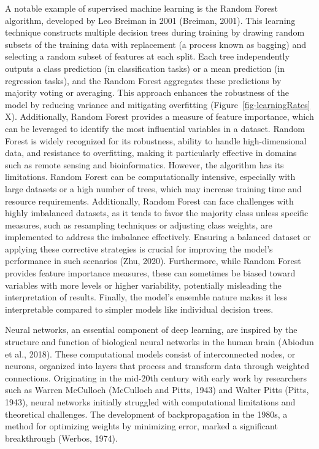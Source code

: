 \documentclass[
  letterpaper,
  11pt,
  english,
  singlespacing,
  headsepline]{MastersDoctoralThesis}
\begin{document}
\begin{spacing}{1.5}
A notable example of supervised machine learning is the Random Forest
algorithm, developed by Leo Breiman in 2001 (Breiman, 2001). This
learning technique constructs multiple decision trees during training by
drawing random subsets of the training data with replacement (a process
known as bagging) and selecting a random subset of features at each
split. Each tree independently outputs a class prediction (in
classification tasks) or a mean prediction (in regression tasks), and
the Random Forest aggregates these predictions by majority voting or
averaging. This approach enhances the robustness of the model by
reducing variance and mitigating overfitting
(Figure~\ref{fig-learningRates} X). Additionally, Random Forest provides
a measure of feature importance, which can be leveraged to identify the
most influential variables in a dataset. Random Forest is widely
recognized for its robustness, ability to handle high-dimensional data,
and resistance to overfitting, making it particularly effective in
domains such as remote sensing and bioinformatics. However, the
algorithm has its limitations. Random Forest can be computationally
intensive, especially with large datasets or a high number of trees,
which may increase training time and resource requirements.
Additionally, Random Forest can face challenges with highly imbalanced
datasets, as it tends to favor the majority class unless specific
measures, such as resampling techniques or adjusting class weights, are
implemented to address the imbalance effectively. Ensuring a balanced
dataset or applying these corrective strategies is crucial for improving
the model's performance in such scenarios (Zhu, 2020). Furthermore,
while Random Forest provides feature importance measures, these can
sometimes be biased toward variables with more levels or higher
variability, potentially misleading the interpretation of results.
Finally, the model's ensemble nature makes it less interpretable
compared to simpler models like individual decision trees.

Neural networks, an essential component of deep learning, are inspired
by the structure and function of biological neural networks in the human
brain (Abiodun et al., 2018). These computational models consist of
interconnected nodes, or neurons, organized into layers that process and
transform data through weighted connections. Originating in the mid-20th
century with early work by researchers such as Warren McCulloch
(McCulloch and Pitts, 1943) and Walter Pitts (Pitts, 1943), neural
networks initially struggled with computational limitations and
theoretical challenges. The development of backpropagation in the 1980s,
a method for optimizing weights by minimizing error, marked a
significant breakthrough (Werbos, 1974).


\end{spacing}
\end{document}
